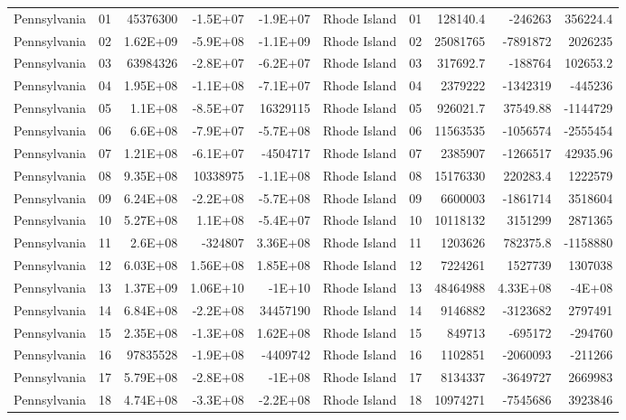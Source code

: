 \begin{landscape}
\begin{singlespace}
\begin{longtable}{lrrrr|lrrrr}
		Pennsylvania &  01  & 45376300 & -1.5E+07 & -1.9E+07 & Rhode Island &  01  & 128140.4 & -246263 & 356224.4 \\
		Pennsylvania &  02  & 1.62E+09 & -5.9E+08 & -1.1E+09 & Rhode Island &  02  & 25081765 & -7891872 & 2026235 \\
		Pennsylvania &  03  & 63984326 & -2.8E+07 & -6.2E+07 & Rhode Island &  03  & 317692.7 & -188764 & 102653.2 \\
		Pennsylvania &  04  & 1.95E+08 & -1.1E+08 & -7.1E+07 & Rhode Island &  04  & 2379222 & -1342319 & -445236 \\
		Pennsylvania &  05  & 1.1E+08 & -8.5E+07 & 16329115 & Rhode Island &  05  & 926021.7 & 37549.88 & -1144729 \\
		Pennsylvania &  06  & 6.6E+08 & -7.9E+07 & -5.7E+08 & Rhode Island &  06  & 11563535 & -1056574 & -2555454 \\
		Pennsylvania &  07  & 1.21E+08 & -6.1E+07 & -4504717 & Rhode Island &  07  & 2385907 & -1266517 & 42935.96 \\
		Pennsylvania &  08  & 9.35E+08 & 10338975 & -1.1E+08 & Rhode Island &  08  & 15176330 & 220283.4 & 1222579 \\
		Pennsylvania &  09  & 6.24E+08 & -2.2E+08 & -5.7E+08 & Rhode Island &  09  & 6600003 & -1861714 & 3518604 \\
		Pennsylvania &  10 & 5.27E+08 & 1.1E+08 & -5.4E+07 & Rhode Island &  10 & 10118132 & 3151299 & 2871365 \\
		Pennsylvania &  11 & 2.6E+08 & -324807 & 3.36E+08 & Rhode Island &  11 & 1203626 & 782375.8 & -1158880 \\
		Pennsylvania &  12 & 6.03E+08 & 1.56E+08 & 1.85E+08 & Rhode Island &  12 & 7224261 & 1527739 & 1307038 \\
		Pennsylvania &  13 & 1.37E+09 & 1.06E+10 & -1E+10 & Rhode Island &  13 & 48464988 & 4.33E+08 & -4E+08 \\
		Pennsylvania &  14 & 6.84E+08 & -2.2E+08 & 34457190 & Rhode Island &  14 & 9146882 & -3123682 & 2797491 \\
		Pennsylvania &  15 & 2.35E+08 & -1.3E+08 & 1.62E+08 & Rhode Island &  15 & 849713 & -695172 & -294760 \\
		Pennsylvania &  16 & 97835528 & -1.9E+08 & -4409742 & Rhode Island &  16 & 1102851 & -2060093 & -211266 \\
		Pennsylvania &  17 & 5.79E+08 & -2.8E+08 & -1E+08 & Rhode Island &  17 & 8134337 & -3649727 & 2669983 \\
		Pennsylvania &  18 & 4.74E+08 & -3.3E+08 & -2.2E+08 & Rhode Island &  18 & 10974271 & -7545686 & 3923846 \\

\end{longtable}
\end{singlespace}
\end{landscape}

